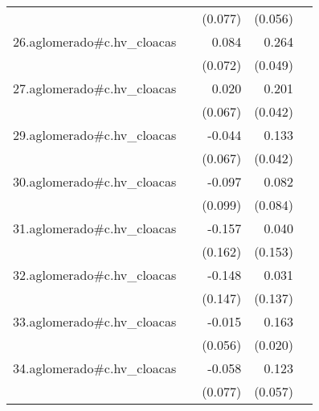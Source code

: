{\begin{longtable}{l*{4}{D{.}{.}{-1}}}
            &                     &     (0.077)         &     (0.056)         &                     \\
\addlinespace
26.aglomerado#c.hv\_cloacas&                     &       0.084         &       0.264\sym{***}&                     \\
            &                     &     (0.072)         &     (0.049)         &                     \\
\addlinespace
27.aglomerado#c.hv\_cloacas&                     &       0.020         &       0.201\sym{***}&                     \\
            &                     &     (0.067)         &     (0.042)         &                     \\
\addlinespace
29.aglomerado#c.hv\_cloacas&                     &      -0.044         &       0.133\sym{**} &                     \\
            &                     &     (0.067)         &     (0.042)         &                     \\
\addlinespace
30.aglomerado#c.hv\_cloacas&                     &      -0.097         &       0.082         &                     \\
            &                     &     (0.099)         &     (0.084)         &                     \\
\addlinespace
31.aglomerado#c.hv\_cloacas&                     &      -0.157         &       0.040         &                     \\
            &                     &     (0.162)         &     (0.153)         &                     \\
\addlinespace
32.aglomerado#c.hv\_cloacas&                     &      -0.148         &       0.031         &                     \\
            &                     &     (0.147)         &     (0.137)         &                     \\
\addlinespace
33.aglomerado#c.hv\_cloacas&                     &      -0.015         &       0.163\sym{***}&                     \\
            &                     &     (0.056)         &     (0.020)         &                     \\
\addlinespace
34.aglomerado#c.hv\_cloacas&                     &      -0.058         &       0.123\sym{*}  &                     \\
            &                     &     (0.077)         &     (0.057)         &                     \\

\end{longtable}}

